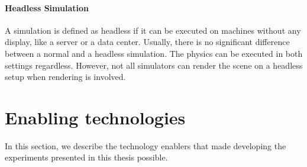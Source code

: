 \paragraph{Headless Simulation}

A simulation is defined as headless if it can be executed on machines without any display, like a server or a data center.
Usually, there is no significant difference between a normal and a headless simulation.
The physics can be executed in both settings regardless.
However, not all simulators can render the scene on a headless setup when rendering is involved.

\pagebreak
\section{Enabling technologies}

In this section, we describe the technology enablers that made developing the experiments presented in this thesis possible.

